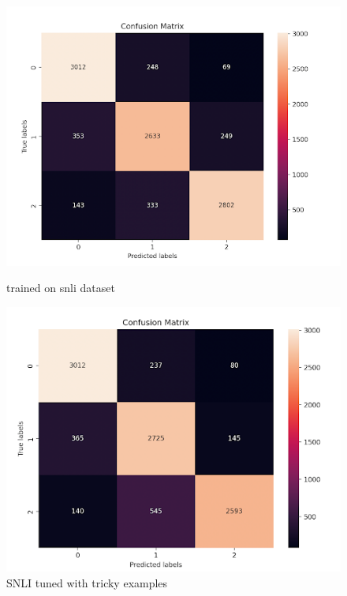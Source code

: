 \documentclass{article}
\begin{document}
\begin{figure}[!h]
  \centering
  \begin{minipage}{0.44\textwidth}
    \includegraphics[width=\linewidth]{images/confusion_trained_snli.png}
    \caption{trained on snli dataset}
    \label{fig:f}
  \end{minipage}
  \hfill
  \begin{minipage}{0.44\textwidth}
    \includegraphics[width=\linewidth]{images/confusion_tuned_snli.png}
    \caption{SNLI tuned with tricky examples}
    \label{fig:g}
  \end{minipage}
\end{figure}
\end{document}
